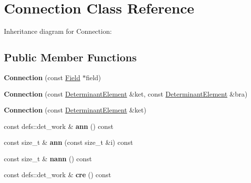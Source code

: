 \hypertarget{classConnection}{}\section{Connection Class Reference}
\label{classConnection}


Inheritance diagram for Connection\+:
\subsection*{Public Member Functions}
\begin{DoxyCompactItemize}
\item 
{\bfseries Connection} (const \hyperlink{classField}{Field} $\ast$field)\hypertarget{classConnection_af4ce8512ec2e108246299a672a8c6631}{}\label{classConnection_af4ce8512ec2e108246299a672a8c6631}

\item 
{\bfseries Connection} (const \hyperlink{classDeterminantElement}{Determinant\+Element} \&ket, const \hyperlink{classDeterminantElement}{Determinant\+Element} \&bra)\hypertarget{classConnection_a0b96cb58be47c490e4be42a13aae4830}{}\label{classConnection_a0b96cb58be47c490e4be42a13aae4830}

\item 
{\bfseries Connection} (const \hyperlink{classDeterminantElement}{Determinant\+Element} \&ket)\hypertarget{classConnection_ab9d08b55aa2848e5fb6243b543c7c1bb}{}\label{classConnection_ab9d08b55aa2848e5fb6243b543c7c1bb}

\item 
const defs\+::det\+\_\+work \& {\bfseries ann} () const \hypertarget{classConnection_a6be30329b0ea0260472704342cbd435c}{}\label{classConnection_a6be30329b0ea0260472704342cbd435c}

\item 
const size\+\_\+t \& {\bfseries ann} (const size\+\_\+t \&i) const \hypertarget{classConnection_ad672469fe1158702fabc342bb34fc31b}{}\label{classConnection_ad672469fe1158702fabc342bb34fc31b}

\item 
const size\+\_\+t \& {\bfseries nann} () const \hypertarget{classConnection_a3e3347717f29609432141b7eedf750ed}{}\label{classConnection_a3e3347717f29609432141b7eedf750ed}

\item 
const defs\+::det\+\_\+work \& {\bfseries cre} () const \hypertarget{classConnection_a7ac096bbf08c67fc11f7cd8be4e25e47}{}\label{classConnection_a7ac096bbf08c67fc11f7cd8be4e25e47}


\end{DoxyCompactItemize}
